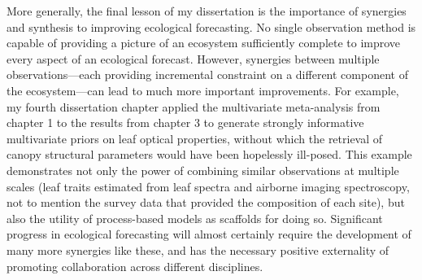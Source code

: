 More generally, the final lesson of my dissertation is the importance of synergies and synthesis to improving ecological forecasting.
No single observation method is capable of providing a picture of an ecosystem sufficiently complete to improve every aspect of an ecological forecast.
However, synergies between multiple observations---each providing incremental constraint on a different component of the ecosystem---can lead to much more important improvements.
For example, my fourth dissertation chapter applied the multivariate meta-analysis from chapter 1 to the results from chapter 3 to generate strongly informative multivariate priors on leaf optical properties, without which the retrieval of canopy structural parameters would have been hopelessly ill-posed.
This example demonstrates not only the power of combining similar observations at multiple scales (leaf traits estimated from leaf spectra and airborne imaging spectroscopy, not to mention the survey data that provided the composition of each site), but also the utility of process-based models as scaffolds for doing so. 
Significant progress in ecological forecasting will almost certainly require the development of many more synergies like these, and has the necessary positive externality of promoting collaboration across different disciplines.




